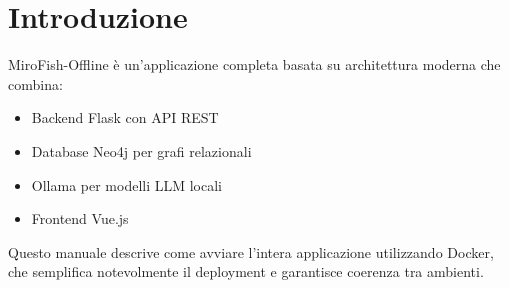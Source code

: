 \section{Introduzione}

MiroFish-Offline è un'applicazione completa basata su architettura moderna che combina:
\begin{itemize}
    \item Backend Flask con API REST
    \item Database Neo4j per grafi relazionali
    \item Ollama per modelli LLM locali
    \item Frontend Vue.js
\end{itemize}

Questo manuale descrive come avviare l'intera applicazione utilizzando Docker, che semplifica notevolmente il deployment e garantisce coerenza tra ambienti.
